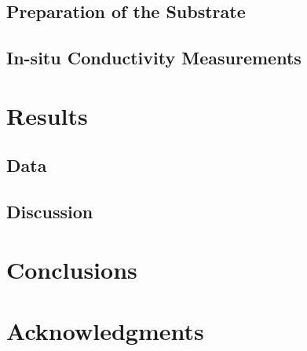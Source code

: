 \documentclass[aps,prl,twocolumn,groupedaddress,showkeys]{revtex4}
\begin{document}
\subsection{Preparation of the Substrate}

\subsection{In-situ Conductivity Measurements}



\section{Results}

\subsection{Data}

\subsection{Discussion}

\section{Conclusions}

\section{Acknowledgments}
\end{document}
